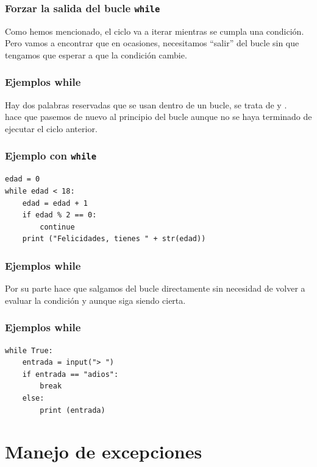 \begin{frame}
\frametitle{Forzar la salida del bucle \texttt{while}}
Como hemos mencionado, el ciclo  va a iterar mientras se cumpla una condición.
\\
\bigskip
Pero vamos a encontrar que en ocasiones, necesitamos \enquote{salir} del bucle sin que tengamos que esperar a que la condición cambie.
\end{frame}
\begin{frame}[fragile]
\frametitle{Ejemplos while}
Hay dos palabras reservadas que se usan dentro de un bucle, se trata de  y .
\\
\bigskip
{} hace que pasemos de nuevo al principio del bucle aunque no se haya terminado de ejecutar el ciclo anterior.
\end{frame}
\begin{frame}[fragile]
\frametitle{Ejemplo con \texttt{while}}
\begin{lstlisting}
edad = 0
while edad < 18:
    edad = edad + 1
    if edad % 2 == 0:
        continue
    print ("Felicidades, tienes " + str(edad))
\end{lstlisting}
\end{frame}
\begin{frame}[fragile]
\frametitle{Ejemplos while}
Por su parte  hace que salgamos del bucle  directamente sin necesidad de volver a evaluar la condición y aunque siga siendo cierta.
\end{frame}
\begin{frame}[fragile]
\frametitle{Ejemplos while}
\begin{lstlisting}
while True:
    entrada = input("> ")
    if entrada == "adios":
        break
    else:
        print (entrada)
\end{lstlisting}
\end{frame}
\section{Manejo de excepciones}
